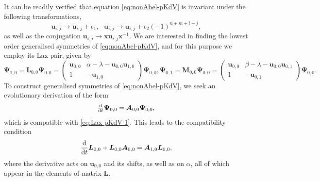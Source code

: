 \documentclass[dvips,10pt]{article}
\newcommand{\bs}{\boldsymbol}
\newcommand{\bsu}{ {\bs{u}}}
\newcommand{\bsx}{ {\bs{x}}}
\theoremstyle{remark} %
\begin{document}
	It can be readily verified that equation \eqref{eq:nonAbel-pKdV} is invariant under the following transformations, 
	\begin{equation} \label{eq:point-sym-pKdV}
		\bsu_{i,j} \rightarrow \bsu_{i,j} + \epsilon_1, ~~~ \bsu_{i,j} \rightarrow \bsu_{i,j} + \epsilon_2 (-1)^{n+m+i+j},
	\end{equation}
	as well as the conjugation $\bsu_{i,j} \rightarrow \bsx \bsu_{i,j} \bsx^{-1}$. We are interested in finding the lowest order generalised symmetries of \eqref{eq:nonAbel-pKdV}, and for this purpose we employ its Lax pair, given by
	\begin{subequations} \label{eq:Lax-pKdV}
		\begin{equation}
			{\bs{\Psi}}_{1,0} = {\bs{L}}_{0,0} {\bs{\Psi}}_{0,0} =   \begin{pmatrix}
				\bsu_{0,0} &   \alpha -\lambda -\bsu_{0,0} \bsu_{1,0} \\ 1 & -\bsu_{1,0}
			\end{pmatrix} {\bs{\Psi}}_{0,0}, \label{eq:Lax-pKdV-1}
		\end{equation}
		\begin{equation}	
			{\bs{\Psi}}_{0,1} = {\bs{M}}_{0,0} {\bs{\Psi}}_{0,0} = \begin{pmatrix}
				\bsu_{0,0} & \beta-\lambda -\bsu_{0,0} \bsu_{0,1} \\ 1 & -\bsu_{0,1}
			\end{pmatrix} {\bs{\Psi}}_{0,0}. \label{eq:Lax-pKdV-2}
		\end{equation}
	\end{subequations}
	To construct generalised symmetries of \eqref{eq:nonAbel-pKdV}, we seek an evolutionary derivation of the form
	$$\tfrac{{\rm{d}}}{{\rm{d}} t}{\bs{\Psi}}_{0,0} = {\bs{A}}_{0,0} {\bs{\Psi}}_{0,0},$$
	which is compatible with \eqref{eq:Lax-pKdV-1}. This leads to the compatibility condition
	$$ \frac{{\rm{d}}}{{\rm{d}} t} {\bs{L}}_{0,0} +  {\bs{L}}_{0,0} {\bs{A}}_{0,0} = {\bs{A}}_{1,0} {\bs{L}}_{0,0},$$
	where the derivative acts on $\bsu_{0,0}$ and its shifts, as well as on $\alpha$, all of which appear in the elements of matrix ${\bs{L}}$.
	
\end{document}
